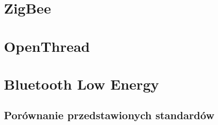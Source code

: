 \section{ZigBee}

\section{OpenThread}

\section{Bluetooth Low Energy}
\subsection{Porównanie przedstawionych standardów} %





